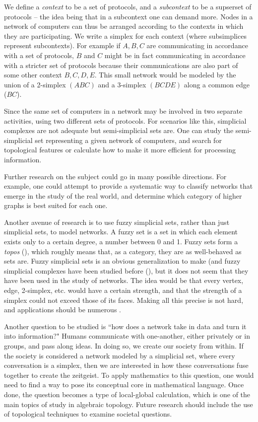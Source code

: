 \documentclass{amsart}
\begin{document}
We define a {\em context} to be a set of protocols, and a {\em subcontext} to be a supserset of protocols -- the idea being that in a subcontext one can demand more.  Nodes in a network of computers can thus be arranged according to the contexts in which they are participating.  We write a simplex for each context (where subsimplices represent subcontexts).  For example if $A,B,C$ are communicating in accordance with a set of protocols, $B$ and $C$ might be in fact communicating in accordance with a stricter set of protocols because their communications are also part of some other context $B,C,D,E$.  This small network would be modeled by the union of a 2-simplex $(ABC)$ and a 3-simplex $(BCDE)$ along a common edge ($BC$).

Since the same set of computers in a network may be involved in two separate activities, using two different sets of protocols.  For scenarios like this, simplicial complexes are not adequate but semi-simplicial sets are.  One can study the semi-simplicial set representing a given network of computers, and search for topological features or calculate how to make it more efficient for processing information.

Further research on the subject could go in many possible directions.  For example, one could attempt to provide a systematic way to classify networks that emerge in the study of the real world, and determine which category of higher graphs is best suited for each one.  

Another avenue of research is to use fuzzy simplicial sets, rather than just simplicial sets, to model networks.  A fuzzy set is a set in which each element exists only to a certain degree, a number between 0 and 1.  Fuzzy sets form a {\em topos} (\cite{Bar}), which roughly means that, as a category, they are as well-behaved as sets are.  Fuzzy simplicial sets is an obvious generalization to make (and fuzzy simplicial complexes have been studied before (\cite{EER}), but it does not seem that they have been used in the study of networks.  The idea would be that every vertex, edge, 2-simplex, etc. would have a certain strength, and that the strength of a simplex could not exceed those of its faces.  Making all this precise is not hard, and applications should be numerous \cite{Spi2}.

Another question to be studied is ``how does a network take in data and turn it into information?"  Humans communicate with one-another, either privately or in groups, and pass along ideas.  In doing so, we create our society from within.  If the society is considered a network modeled by a simplicial set, where every conversation is a simplex, then we are interested in how these conversations fuse together to create the zeitgeist.  To apply mathematics to this question, one would need to find a way to pose its conceptual core in mathematical language.  Once done, the question becomes a type of local-global calculation, which is one of the main topics of study in algebraic topology.  Future research should include the use of topological techniques to examine societal questions.
\end{document}
